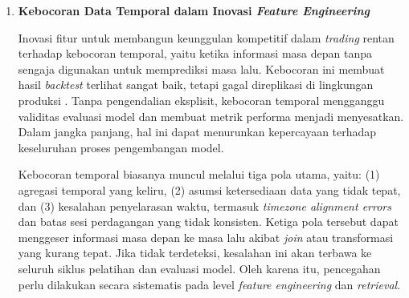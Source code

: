 \begin{enumerate}
    \vspace{0.5em}

    Karena itu, dibutuhkan \textbf{\textit{monitoring}} statistik \textit{near-real-time} dan periodik terhadap distribusi fitur serta keluaran prediksi, disertai \textit{alerting} proaktif dan \textit{automated retraining} ketika ambang \textit{drift} terlampaui \autocite{bayram2022concept}. \textit{Drift detection pipeline} perlu membedakan antara \textit{noise} yang wajar dan pergeseran sistematis yang memerlukan pembaruan model. Integrasi antara \textit{statistical testing} dan \textit{business logic} membantu menekan \textit{false positive alerts} tanpa mengurangi sensitivitas terhadap perubahan yang kritis. Dengan demikian, sistem dapat merespons dinamika pasar secara lebih terkendali dan konsisten.

    \vspace{0.5em}

    \item \textbf{Kebocoran Data Temporal dalam Inovasi \textit{Feature Engineering}}
    
    Inovasi fitur untuk membangun keunggulan kompetitif dalam \textit{trading} rentan terhadap kebocoran temporal, yaitu ketika informasi masa depan tanpa sengaja digunakan untuk memprediksi masa lalu. Kebocoran ini membuat hasil \textit{backtest} terlihat sangat baik, tetapi gagal direplikasi di lingkungan produksi \autocite{wang2021leakage}. Tanpa pengendalian eksplisit, kebocoran temporal mengganggu validitas evaluasi model dan membuat metrik performa menjadi menyesatkan. Dalam jangka panjang, hal ini dapat menurunkan kepercayaan terhadap keseluruhan proses pengembangan model.
    
    \vspace{0.5em}

    Kebocoran temporal biasanya muncul melalui tiga pola utama, yaitu: (1) agregasi temporal yang keliru, (2) asumsi ketersediaan data yang tidak tepat, dan (3) kesalahan penyelarasan waktu, termasuk \textit{timezone alignment errors} dan batas sesi perdagangan yang tidak konsisten. Ketiga pola tersebut dapat menggeser informasi masa depan ke masa lalu akibat \textit{join} atau transformasi yang kurang tepat. Jika tidak terdeteksi, kesalahan ini akan terbawa ke seluruh siklus pelatihan dan evaluasi model. Oleh karena itu, pencegahan perlu dilakukan secara sistematis pada level \textit{feature engineering} dan \textit{retrieval}.
    
    \vspace{0.5em}


\end{enumerate}
